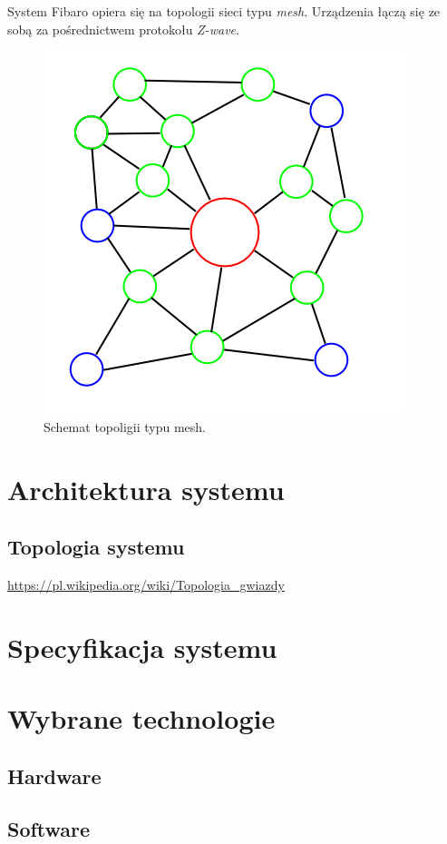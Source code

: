 \documentclass[eng,oneside]{mgr}
\begin{document}
System Fibaro opiera się na topologii sieci typu \textit{mesh}. Urządzenia łączą się ze sobą za pośrednictwem protokołu \textit{Z-wave}.
\begin{figure}[h]
\centering
\includegraphics[width=0.7\linewidth]{mesh}
\caption{Schemat topoligii typu mesh.}
\label{fig:Mesh-Network}
\end{figure}

\chapter{Architektura systemu}
\section{Topologia systemu}
\url{https://pl.wikipedia.org/wiki/Topologia_gwiazdy}
\chapter{Specyfikacja systemu}
\chapter{Wybrane technologie}
\section{Hardware}
\section{Software}
\end{document}
